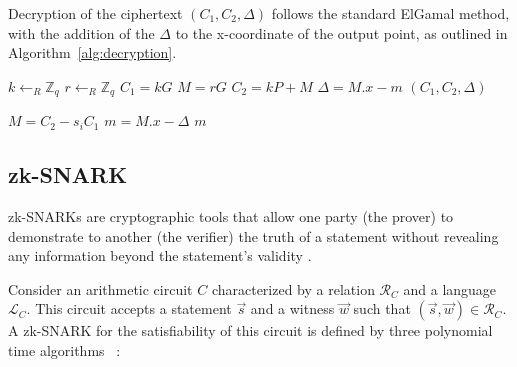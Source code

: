 \documentclass[runningheads]{llncs}
\begin{document}
Decryption of the ciphertext $(C_1, C_2, \Delta)$ follows the standard ElGamal method, with the addition of the $\Delta$ to the x-coordinate of the output point, as outlined in Algorithm~\ref{alg:decryption}.

\begin{algorithm}
    \caption{$\texttt{Enc}_{P_i}$}
    \label{alg:encryption}
    
    
    $k \gets_R \mathbb{Z}_q$\;
    $r \gets_R \mathbb{Z}_q$\;
    $C_1 = kG$\;
    $M = rG$\;
    $C_2 = kP + M$\;
    $\Delta = M.x - m$\;
    \Return $(C_1, C_2, \Delta)$
\end{algorithm}

\begin{algorithm}
    \caption{$\texttt{Dec}_{s_i}$}
    \label{alg:decryption}
    
    
    $M = C_2 - s_i C_1$\;
    $m = M.x - \Delta$\;
    \Return $m$
\end{algorithm}




\subsection{zk-SNARK}

zk-SNARKs are cryptographic tools that allow one party (the prover) to demonstrate to another (the verifier) the truth of a statement without revealing any information beyond the statement's validity \cite{grothSizePairingbasedNoninteractive2016}.

Consider an arithmetic circuit $C$ characterized by a relation $\mathcal{R}_C$ and a language $\mathcal{L}_C$. This circuit accepts a statement $\vec{s}$ and a witness $\vec{w}$ such that $(\vec{s}, \vec{w}) \in \mathcal{R}_C$. A zk-SNARK for the satisfiability of this circuit is defined by three polynomial time algorithms ~\cite{grothSizePairingbasedNoninteractive2016,parnoPinocchioNearlyPractical2013}:
\end{document}
